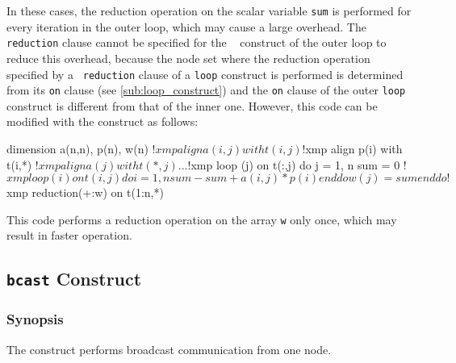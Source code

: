 \begin{description}

In these cases, the reduction operation on the scalar variable {\tt sum}
is performed for every iteration in the outer loop, which may cause a
large overhead.
The {\tt reduction} clause cannot be specified for the {\tt
{}} construct of the outer loop to reduce this overhead,
%
because the node set where the reduction operation specified by a {\tt
reduction} clause of a {\tt loop} construct is performed is determined
from its {\tt on} clause (see \ref{sub:loop_construct}) and
the {\tt on} clause of the outer {\tt loop} construct is different from
that of the inner one. 
%
However, this code can be modified with the {\tt {}}
construct as follows: 

\begin{Fexample}
      dimension a(n,n), p(n), w(n)
!$xmp align a(i,j) with t(i,j)
!$xmp align p(i) with t(i,*)
!$xmp align a(j) with t(*,j)
      ...
!$xmp loop (j) on t(:,j)
      do j = 1, n
          sum = 0
!$xmp loop (i) on t(i,j) 
          do i = 1, n
              sum - sum + a(i,j) * p(i)
          end do
          w(j) = sum
      end do
!$xmp reduction(+:w) on t(1:n,*)
\end{Fexample}

This code performs a reduction operation on the array {\tt w} only once,
which may result in faster operation.  

\end{description}


\subsection{{\tt bcast} Construct}

\subsubsection*{Synopsis}

The {\tt {}} construct performs broadcast communication
from one node.

